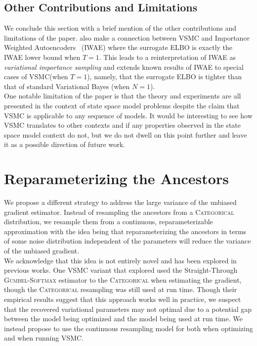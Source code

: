 \documentclass[12pt]{article}
\newcommand{\vsmc}{\textsc{VSMC}\xspace}
\newcommand{\elbo}{\textsc{ELBO}\xspace}
\newcommand{\categorical}{\textsc{Categorical}\xspace}
\newcommand{\gumbelsoftmax}{\textsc{Gumbel-Softmax}\xspace}
\newcommand{\iwae}{\textsc{IWAE}\xspace}
\begin{document}
\subsection{Other Contributions and Limitations}

We conclude this section with a brief mention of the other contributions and limitations of the paper. \textcite{Naesseth:2018} also make a connection between \vsmc and Importance Weighted Autoencoders~\parencite{Burda:2016} (\iwae) where the surrogate \elbo is exactly the \iwae lower bound when $T=1$. This leads to a reinterpretation of \iwae as \textit{variational importance sampling} and extends known results of \iwae to special cases of \vsmc (when $T=1$), namely, that the surrogate \elbo is tighter than that of standard Variational Bayes (when $N=1$).
\\

One notable limitation of the paper is that the theory and experiments are all presented in the context of state space model problems despite the claim that \vsmc is applicable to any sequence of models. It would be interesting to see how \vsmc translates to other contexts and if any properties observed in the state space model context do not, but we do not dwell on this point further and leave it as a possible direction of future work.

\section{Reparameterizing the Ancestors}\label{sec:approx}

We propose a different strategy to address the large variance of the unbiased gradient estimator. Instead of resampling the ancestors from a \categorical distribution, we resample them from a continuous, reparameterizable approximation with the idea being that reparameterizing the ancestors in terms of some noise distribution independent of the parameters will reduce the variance of the unbiased gradient.
\\

We acknowledge that this idea is not entirely novel and has been explored in previous works. One \vsmc variant that \textcite{Lawson:2018} explored used the Straight-Through \gumbelsoftmax estimator \parencite{Jang:2017} to the \categorical when estimating the gradient, though the \categorical resampling was still used at run time. Though their empirical results suggest that this approach works well in practice, we suspect that the recovered variational parameters may not optimal due to a potential gap between the model being optimized and the model being used at run time. We instead propose to use the continuous resampling model for both when optimizing and when running \vsmc.
\\
\end{document}
